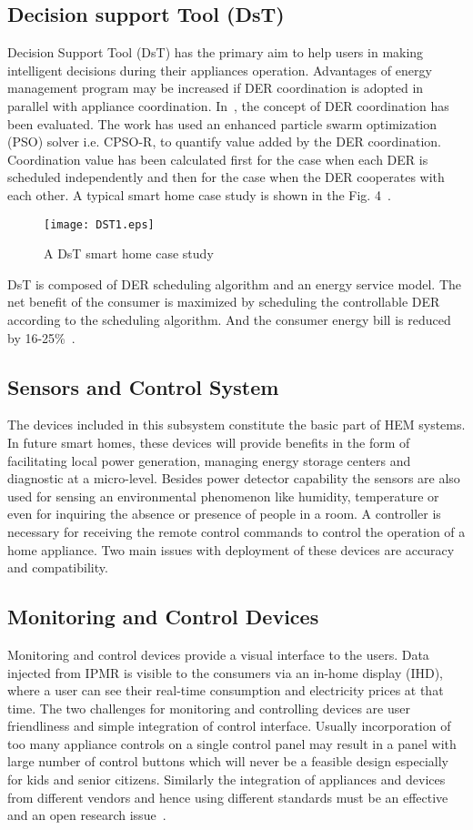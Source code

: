 \documentclass[journal]{IEEEtran}
\begin{document}
\subsection{Decision support Tool (DsT)}
Decision Support Tool (DsT) has the primary aim to help  users in making intelligent decisions during their appliances operation. Advantages of energy management program may be increased if DER coordination is adopted in parallel with appliance coordination. In~\cite{pedrasa2010coordinated}, the concept of DER coordination has been evaluated. The work has used an enhanced particle swarm optimization (PSO) solver i.e. CPSO-R, to quantify value added by the DER coordination. Coordination value has been calculated first for the case when each DER is scheduled independently and then for the case when the DER cooperates with each other. A typical smart home case study is shown in the Fig. 4~\cite{pedrasa2010coordinated}.
\begin{figure}[!h]
\centering
\texttt{[image: DST1.eps]}
\caption{A DsT smart home case study}
\end{figure}
DsT is composed of DER scheduling algorithm and an energy service model. The net benefit of the consumer is maximized by scheduling the controllable DER according to the scheduling algorithm. And the consumer energy bill is reduced by 16-25\%~\cite{pedrasa2010coordinated}.

\subsection{Sensors and Control System}
The devices included in this subsystem constitute the basic part of HEM systems. In future smart homes, these devices will provide benefits in the form of facilitating local power generation, managing energy storage centers and diagnostic at a micro-level. Besides power detector capability the sensors are also used for sensing an environmental phenomenon like humidity, temperature or even for inquiring the absence or presence of people in a room. A controller is necessary for receiving the remote control commands to control the operation of a home appliance. Two main issues with deployment of these devices are accuracy and compatibility.\\
\subsection{Monitoring and Control Devices}
Monitoring and control devices provide a visual interface to the users. Data injected from IPMR is visible to the consumers via an in-home display (IHD), where a user can see their real-time consumption and electricity prices at that time. The two challenges for monitoring and controlling devices are user friendliness and simple integration of control interface. Usually incorporation of too many appliance controls on a single control panel may result in a panel with large number of control buttons which will never be a feasible design especially for kids and senior citizens. Similarly the integration of appliances and devices from different vendors and hence using different standards must be an effective and an open research issue~\cite{kailas2012survey}.\\
\end{document}

